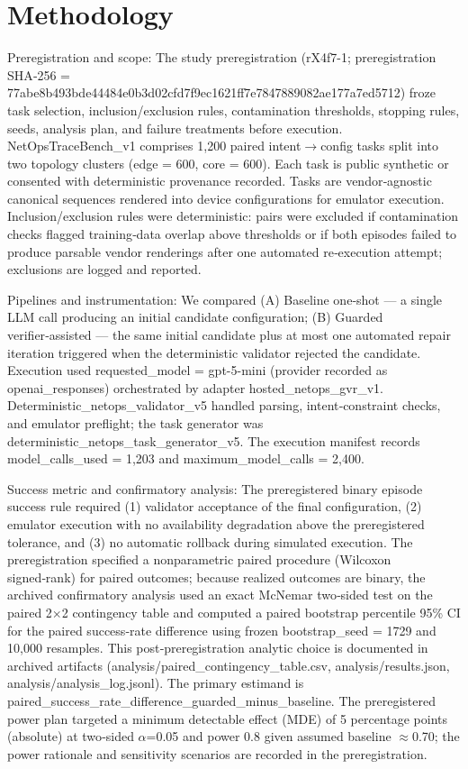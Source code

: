 \documentclass[conference]{IEEEtran}
\begin{document}
\section{Methodology}
Preregistration and scope: The study preregistration (rX4f7-1; preregistration SHA‑256 = 77abe8b4\allowbreak{}93bde444\allowbreak{}84e0b3d0\allowbreak{}2cfd7f9e\allowbreak{}c1621ff7\allowbreak{}e7847889\allowbreak{}082ae177\allowbreak{}a7ed5712) froze task selection, inclusion/exclusion rules, contamination thresholds, stopping rules, seeds, analysis plan, and failure treatments before execution. NetOpsTraceBench\_v1 comprises 1,200 paired intent\ensuremath{\rightarrow}config tasks split into two topology clusters (edge = 600, core = 600). Each task is public synthetic or consented with deterministic provenance recorded. Tasks are vendor‑agnostic canonical sequences rendered into device configurations for emulator execution. Inclusion/exclusion rules were deterministic: pairs were excluded if contamination checks flagged training‑data overlap above thresholds or if both episodes failed to produce parsable vendor renderings after one automated re‑execution attempt; exclusions are logged and reported.

Pipelines and instrumentation: We compared (A) Baseline one‑shot --- a single LLM call producing an initial candidate configuration; (B) Guarded verifier‑assisted --- the same initial candidate plus at most one automated repair iteration triggered when the deterministic validator rejected the candidate. Execution used requested\_model = gpt-5-mini (provider recorded as openai\_responses) orchestrated by adapter hosted\_netops\_gvr\_v1. Deterministic\_netops\_validator\_v5 handled parsing, intent‑constraint checks, and emulator preflight; the task generator was deterministic\_netops\_task\_generator\_v5. The execution manifest records model\_calls\_used = 1,203 and maximum\_model\_calls = 2,400.

Success metric and confirmatory analysis: The preregistered binary episode success rule required (1) validator acceptance of the final configuration, (2) emulator execution with no availability degradation above the preregistered tolerance, and (3) no automatic rollback during simulated execution. The preregistration specified a nonparametric paired procedure (Wilcoxon signed‑rank) for paired outcomes; because realized outcomes are binary, the archived confirmatory analysis used an exact McNemar two‑sided test on the paired 2\ensuremath{\times}2 contingency table and computed a paired bootstrap percentile 95\% CI for the paired success‑rate difference using frozen bootstrap\_seed = 1729 and 10,000 resamples. This post‑preregistration analytic choice is documented in archived artifacts (analysis/paired\_contingency\_table.csv, analysis/results.json, analysis/analysis\_log.jsonl). The primary estimand is paired\_success\_rate\_difference\_guarded\_minus\_baseline. The preregistered power plan targeted a minimum detectable effect (MDE) of 5 percentage points (absolute) at two‑sided \ensuremath{\alpha}=0.05 and power 0.8 given assumed baseline \ensuremath{\approx}0.70; the power rationale and sensitivity scenarios are recorded in the preregistration.
\end{document}
